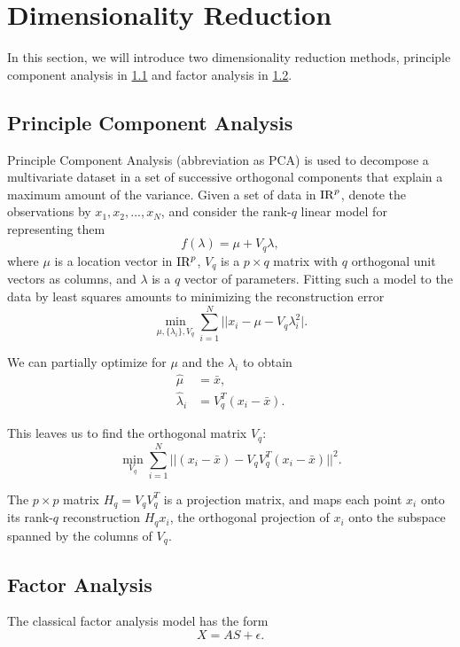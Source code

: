 \documentclass[10pt,journal,compsoc]{IEEEtran}
\begin{document}
\section{Dimensionality Reduction}
\label{sec:dimensionality_reduction}
In this section, we will introduce two dimensionality reduction methods, principle component analysis in \ref{subsec:pca} and factor analysis in \ref{subsec:fa}.

\subsection{Principle Component Analysis}
\label{subsec:pca}

Principle Component Analysis (abbreviation as PCA) is used to decompose a multivariate dataset in a set of successive orthogonal components that explain a maximum amount of the variance. Given a set of data in ${\rm IR}^p$, denote the observations by $x_1, x_2,...,x_N$, and consider the rank-$q$ linear model for representing them
\begin{equation}
  f(\lambda) = \mu + V_q\lambda,
\end{equation}
where $\mu$ is a location vector in ${\rm IR}^p$, $V_q$ is a $p \times q$ matrix with $q$ orthogonal unit vectors as columns, and $\lambda$ is a $q$ vector of parameters. Fitting such a model to the data by least squares amounts to minimizing the reconstruction error
\begin{equation}
  \min_{\mu, \{\lambda_i\}, V_q} \sum_{i=1}^N||x_i - \mu - V_q\lambda_i^2|.
\end{equation}

We can partially optimize for $\mu$ and the $\lambda_i$ to obtain
\begin{align}
  \hat{\mu} &= \bar{x},\\
  \hat{\lambda}_i &= V_q^T(x_i - \bar{x}).
\end{align}

This leaves us to find the orthogonal matrix $V_q$:
\begin{equation}
  \min_{V_q}\sum_{i=1}^N||(x_i - \bar{x}) - V_qV_q^T(x_i - \bar{x})||^2.
\end{equation}

The $p\times p$ matrix $H_q = V_qV_q^T$ is a projection matrix, and maps each point $x_i$ onto its rank-$q$ reconstruction $H_qx_i$, the orthogonal projection of $x_i$ onto the subspace spanned by the columns of $V_q$.

\subsection{Factor Analysis}
\label{subsec:fa}
The classical factor analysis model has the form
\begin{equation}
  X = AS + \epsilon.
\end{equation}
\end{document}
